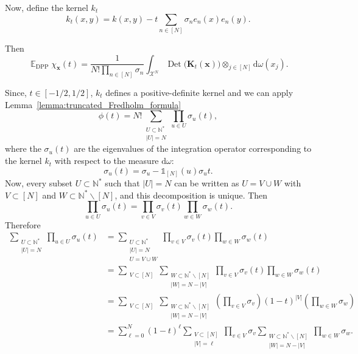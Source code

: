 \documentclass[twoside,11pt]{book}
\numberwithin{theorem}{chapter}
\numberwithin{definition}{chapter}
\numberwithin{proposition}{chapter}
\numberwithin{corollary}{chapter}
\numberwithin{example}{chapter}
\numberwithin{lemma}{chapter}
\numberwithin{assumption}{chapter}
\numberwithin{equation}{chapter}
\numberwithin{figure}{chapter}
\DeclareMathOperator{\Det}{Det}
\DeclareMathOperator{\DPP}{\mathrm{DPP}}
\DeclareMathOperator{\EX}{\mathbb{E}}
\begin{document}
Now, define the kernel $k_{t}$ 
\begin{equation}
k_{t}(x,y) = k(x,y) - t\sum\limits_{n \in [N]}\sigma_{n}e_{n}(x)e_{n}(y).
\end{equation}

Then
\begin{equation}
\EX_{\DPP} \chi_{\bm{x}}(t) = \frac{1}{N!\prod\limits_{n \in [N]}\sigma_{n}} \int_{\mathcal{X}^{N}} \Det \big( \bm{K}_{t}(\bm{x}) \big) \otimes_{j \in [N]} \mathrm{d}\omega(x_{j}).
\end{equation}


Since, $t \in [-1/2,1/2]$, $k_{t}$ defines a positive-definite kernel and we can apply Lemma~\ref{lemma:truncated_Fredholm_formula}
\begin{equation}
\phi(t) = N!\sum\limits_{\substack{U \subset \mathbb{N}^{*}\\ |U| = N}} \prod\limits_{u \in U} \sigma_{u}(t),
\end{equation}
where the $\sigma_{u}(t)$ are the eigenvalues of the integration operator corresponding to the kernel $k_{t}$ with respect to the measure $\mathrm{d}\omega$:
\begin{equation}
\sigma_{u}(t) = \sigma_{u} - \mathbb{1}_{[N]}(u)\sigma_{u} t.
\end{equation}
Now, every subset $U \subset \mathbb{N}^{*}$ such that $|U| = N$ can be written as $U = V \cup W$ with $V \subset [N]$ and $W \subset \mathbb{N}^{*} \smallsetminus [N]$, and this decomposition is unique. Then
\begin{equation}
\prod\limits_{u \in U}\sigma_{u}(t) = \prod\limits_{v \in V}\sigma_{v}(t) \prod\limits_{w \in W}\sigma_{w}(t).
\end{equation}
Therefore
\begin{align}
    \sum\limits_{\substack{U \subset \mathbb{N}^{*} \\ |U| = N}} \prod\limits_{u \in U}\sigma_{u}(t) & = \sum\limits_{\substack{U \subset \mathbb{N}^{*} \\ |U| = N\\ U = V \cup W}} \prod\limits_{v \in V}\sigma_{v}(t) \prod\limits_{w \in W}\sigma_{w}(t) \\
    & = \sum\limits_{\substack{V \subset [N]}} \sum\limits_{\substack{W \subset \mathbb{N}^{*}\smallsetminus [N]\\ |W| = N-|V|}} \prod\limits_{v \in V}\sigma_{v}(t) \prod\limits_{w \in W}\sigma_{w}(t) \nonumber\\
    & = \sum\limits_{\substack{V \subset [N]}} \sum\limits_{\substack{W \subset \mathbb{N}^{*}\smallsetminus [N]\\ |W| = N-|V|}} (\prod\limits_{v \in V}\sigma_{v})(1-t)^{|V|} (\prod\limits_{w \in W}\sigma_{w}) \nonumber\\
    & =\sum\limits_{\ell =0}^{N} (1-t)^{\ell} \sum\limits_{\substack{V \subset [N]\\|V| = \ell}} \prod\limits_{v \in V}\sigma_{v}  \sum\limits_{\substack{W \subset \mathbb{N}^{*} \smallsetminus[N]\\  |W|= N-|V|}}  \prod\limits_{w \in W}\sigma_{w}.
\end{align}
\end{document}
